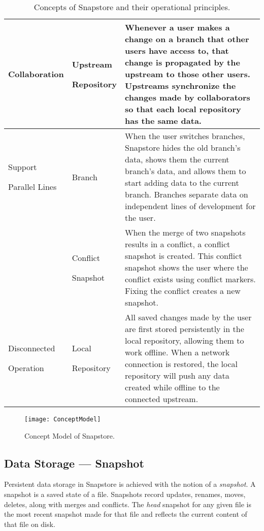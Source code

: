 \begin{table}
\begin{tabular}{ |p{2.25cm}||p{2.25cm}||p{12.5cm}|}
 \hline
 Collaboration & \parbox[t]{3cm}{Upstream \par Repository\strut} & Whenever a user makes a change on a branch that other users have access to, that change is propagated by the upstream to those other users. Upstreams synchronize the changes made by collaborators so that each local repository has the same data.\\[8pt]
 \hline
 \parbox[t]{3cm}{Support \par Parallel Lines\strut} & Branch & When the user switches branches, Snapstore hides the old branch's data, shows them the current branch's data, and allows them to start adding data to the current branch. Branches separate data on independent lines of development for the user.\\[8pt]
  & \parbox[t]{3cm}{Conflict \par Snapshot\strut} & When the merge of two snapshots results in a conflict, a conflict snapshot is created. This conflict snapshot shows the user where the conflict exists using conflict markers. Fixing the conflict creates a new snapshot.\\[8pt]
 \hline
 \parbox[t]{3cm}{Disconnected \par Operation\strut} & \parbox[t]{3cm}{Local \par Repository\strut} & All saved changes made by the user are first stored persistently in the local repository, allowing them to work offline. When a network connection is restored, the local repository will push any data created while offline to the connected upstream.\\[8pt]
 \hline
\end{tabular}
\caption{Concepts of Snapstore and their operational principles.}
\end{table}


\begin{figure}
\texttt{[image: ConceptModel]}
\caption{Concept Model of Snapstore.}
\label{arm:fig1}
\end{figure}

\subsection{Data Storage --- Snapshot}

Persistent data storage in Snapstore is achieved with the notion of a \textit{snapshot}. A snapshot is a saved state of a file. Snapshots record updates, renames, moves, deletes, along with merges and conflicts. The \textit{head} snapshot for any given file is the most recent snapshot made for that file and reflects the current content of that file on disk. 

